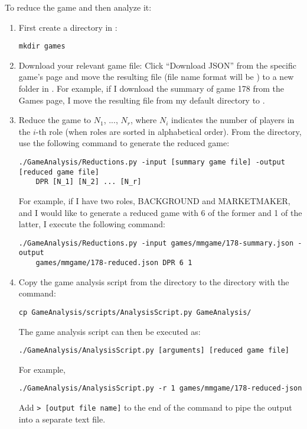 \documentclass[11pt]{article}
\begin{document}
To reduce the game and then analyze it:
\begin{enumerate}
\item First create a directory  in :
\begin{verbatim}
mkdir games
\end{verbatim}
\item Download your relevant game file: Click ``Download JSON'' from the specific game's page and move the resulting file (file name format will be ) to a new folder in . For example, if I download the summary of game 178 from the Games page, I move the resulting  file from my default  directory to . 
\item Reduce the game to $N_1$, ..., $N_r$, where $N_i$ indicates the number of players in the $i$-th role (when roles are sorted in alphabetical order). From the  directory, use the following command to generate the reduced game:
\begin{verbatim}
./GameAnalysis/Reductions.py -input [summary game file] -output [reduced game file] 
    DPR [N_1] [N_2] ... [N_r]
\end{verbatim}
For example, if I have two roles, BACKGROUND and MARKETMAKER, and I would like to generate a reduced game with 6 of the former and 1 of the latter, I execute the following command:
\begin{verbatim}
./GameAnalysis/Reductions.py -input games/mmgame/178-summary.json -output 
    games/mmgame/178-reduced.json DPR 6 1
\end{verbatim}

\item Copy the game analysis script from the  directory to the  directory with the command:
\begin{verbatim}
cp GameAnalysis/scripts/AnalysisScript.py GameAnalysis/
\end{verbatim}
The game analysis script can then be executed as:
\begin{verbatim}
./GameAnalysis/AnalysisScript.py [arguments] [reduced game file]
\end{verbatim}
For example,
\begin{verbatim}
./GameAnalysis/AnalysisScript.py -r 1 games/mmgame/178-reduced-json
\end{verbatim}
Add \verb|> [output file name]| to the end of the command to pipe the output into a separate text file.
\end{enumerate}
\end{document}
